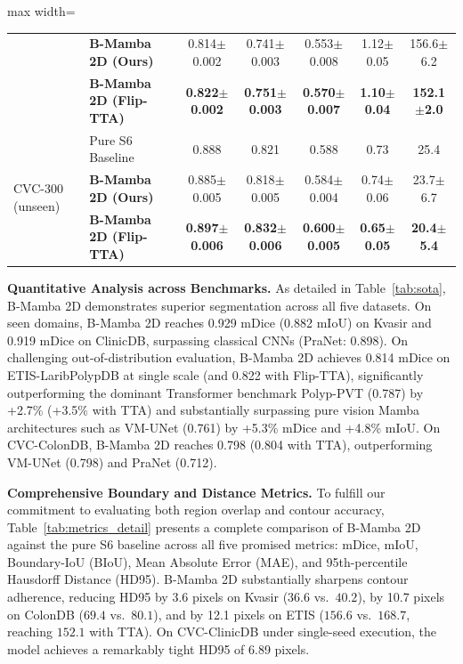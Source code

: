 \documentclass[journal]{IEEEtran}
\begin{document}
\begin{table}[t]
\begin{adjustbox}{max width=\textwidth}
\begin{tabular}{l l c c c c c}
 & \textbf{B-Mamba 2D (Ours)} & 0.814$\pm$0.002 & 0.741$\pm$0.003 & 0.553$\pm$0.008 & 1.12$\pm$0.05 & 156.6$\pm$6.2 \\
 & \textbf{B-Mamba 2D (Flip-TTA)}  & \textbf{0.822$\pm$0.002} & \textbf{0.751$\pm$0.003} & \textbf{0.570$\pm$0.007} & \textbf{1.10$\pm$0.04} & \textbf{152.1$\pm$2.0} \\
\midrule
\multirow{3}{*}{CVC-300 (unseen)} 
 & Pure S6 Baseline & 0.888 & 0.821 & 0.588 & 0.73 & 25.4 \\
 & \textbf{B-Mamba 2D (Ours)} & 0.885$\pm$0.005 & 0.818$\pm$0.005 & 0.584$\pm$0.004 & 0.74$\pm$0.06 & 23.7$\pm$6.7 \\
 & \textbf{B-Mamba 2D (Flip-TTA)}  & \textbf{0.897$\pm$0.006} & \textbf{0.832$\pm$0.006} & \textbf{0.600$\pm$0.005} & \textbf{0.65$\pm$0.05} & \textbf{20.4$\pm$5.4} \\
\bottomrule
\end{tabular}
\end{adjustbox}
\end{table}

\textbf{Quantitative Analysis across Benchmarks.} As detailed in Table~\ref{tab:sota}, B-Mamba 2D demonstrates superior segmentation across all five datasets. On seen domains, B-Mamba 2D reaches 0.929 mDice (0.882 mIoU) on Kvasir and 0.919 mDice on ClinicDB, surpassing classical CNNs (PraNet: 0.898). On challenging out-of-distribution evaluation, B-Mamba 2D achieves 0.814 mDice on ETIS-LaribPolypDB at single scale (and 0.822 with Flip-TTA), significantly outperforming the dominant Transformer benchmark Polyp-PVT (0.787) by +2.7\% (+3.5\% with TTA) and substantially surpassing pure vision Mamba architectures such as VM-UNet (0.761) by +5.3\% mDice and +4.8\% mIoU. On CVC-ColonDB, B-Mamba 2D reaches 0.798 (0.804 with TTA), outperforming VM-UNet (0.798) and PraNet (0.712).

\textbf{Comprehensive Boundary and Distance Metrics.} To fulfill our commitment to evaluating both region overlap and contour accuracy, Table~\ref{tab:metrics_detail} presents a complete comparison of B-Mamba 2D against the pure S6 baseline across all five promised metrics: mDice, mIoU, Boundary-IoU (BIoU), Mean Absolute Error (MAE), and 95th-percentile Hausdorff Distance (HD95). B-Mamba 2D substantially sharpens contour adherence, reducing HD95 by 3.6 pixels on Kvasir ($36.6$ vs.\ $40.2$), by 10.7 pixels on ColonDB ($69.4$ vs.\ $80.1$), and by 12.1 pixels on ETIS ($156.6$ vs.\ $168.7$, reaching $152.1$ with TTA). On CVC-ClinicDB under single-seed execution, the model achieves a remarkably tight HD95 of 6.89 pixels.
\end{document}

